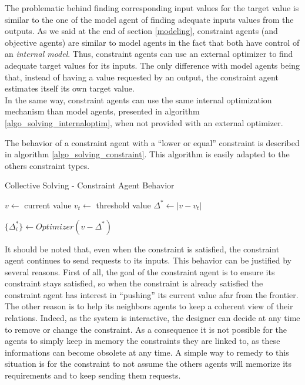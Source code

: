 The problematic behind finding corresponding input values for the target value is similar to the one of the model agent of finding adequate inputs values from the outputs. As we said at the end of section \ref{modeling}, constraint agents (and objective agents) are similar to model agents in the fact that both have control of an \emph{internal model}. Thus, constraint agents can use an external optimizer to find adequate target values for its inputs. The only difference with model agents being that, instead of having a value requested by an output, the constraint agent estimates itself its own target value.\\
In the same way, constraint agents can use the same internal optimization mechanism than model agents, presented in algorithm \ref{algo_solving_internaloptim}, when not provided with an external optimizer.

The behavior of a constraint agent with a \enquote{lower or equal} constraint is described in algorithm \ref{algo_solving_constraint}. This algorithm is easily adapted to the others constraint types.

\begin{algorithm}
\caption{Collective Solving - Constraint Agent Behavior}
\label{algo_solving_constraint}

$v \leftarrow $ current value\;
$v_t \leftarrow $ threshold value\;
$\Delta^* \leftarrow |v - v_t|$\;

\BlankLine
$\{ \Delta^*_i \} \leftarrow Optimizer(v - \Delta^*)$\;
\end{algorithm}

It should be noted that, even when the constraint is satisfied, the constraint agent continues to send requests to its inputs. This behavior can be justified by several reasons. First of all, the goal of the constraint agent is to ensure its constraint stays satisfied, so when the constraint is already satisfied the constraint agent has interest in \enquote{pushing} its current value afar from the frontier.\\
The other reason is to help its neighbors agents to keep a coherent view of their relations. Indeed, as the system is interactive, the designer can decide at any time to remove or change the constraint. As a consequence it is not possible for the agents to simply keep in memory the constraints they are linked to, as these informations can become obsolete at any time. A simple way to remedy to this situation is for the constraint to not assume the others agents will memorize its requirements and to keep sending them requests.

